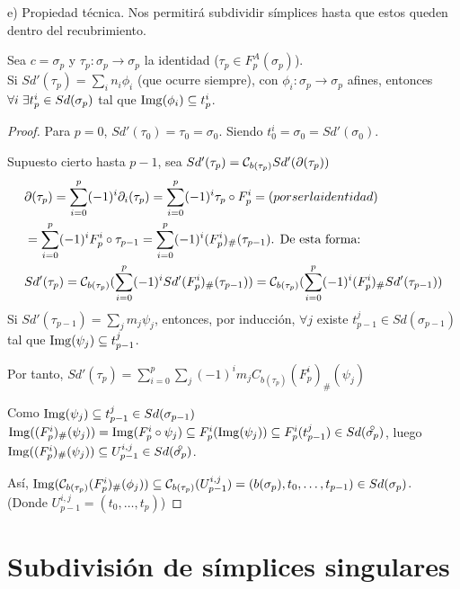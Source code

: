e) Propiedad técnica. Nos permitirá subdividir símplices hasta que estos queden dentro del recubrimiento.

Sea $c = \sigma_p$ y $\tau_p \colon \sigma_p \to \sigma_p$ la identidad ($\tau_p \in F_p^A(\sigma_p)$). \\
Si $Sd'(\tau_p) = \sum_i n_i \phi_i$ (que ocurre siempre), con $\phi_i \colon \sigma_p \to \sigma_p$ afines, entonces
$\forall i \hspace{0.3em} \exists t_p^i \in Sd(\sigma_p)$ tal que $\operatorname{Img}(\phi_i) \subseteq t_p^i$.

\begin{proof}
  Para $p = 0$, $Sd'(\tau_0) = \tau_0 = \sigma_0$. Siendo $t_0^i = \sigma_0 = Sd'(\sigma_0)$.

  Supuesto cierto hasta $p-1$, sea $Sd'(\tau_p) = {\mathcal C}_{b(\tau_p)} Sd'(\partial(\tau_p))$
  \begin{align*}
    &\partial(\tau_p) = \sum\limits_{i = 0}^p (-1)^i \partial_i(\tau_p) = \sum\limits_{i = 0}^p (-1)^i \tau_p \circ F_p^i = (por ser la identidad) \\
    &= \sum\limits_{i = 0}^p (-1)^i F_p^i \circ \tau_{p-1} = \sum\limits_{i = 0}^p (-1)^i(F_p^i)_\# (\tau_{p-1}) \text{. De esta forma:} \\
    &Sd'(\tau_p) = {\mathcal C}_{b(\tau_p)}(\sum\limits_{i = 0}^p (-1)^i Sd'(F_p^i)_\# (\tau_{p-1})) = {\mathcal C}_{b(\tau_p)}(\sum\limits_{i = 0}^p (-1)^i(F_p^i)_\# Sd'(\tau_{p-1})) \\
  \end{align*}
  Si $Sd'(\tau_{p-1}) = \sum\limits_j m_j \psi_j$, entonces, por inducción, $\forall j$ existe $t_{p-1}^j \in Sd(\sigma_{p-1})$ tal que
  $\operatorname{Img}(\psi_j) \subseteq t_{p-1}^j$.

  Por tanto, $Sd'(\tau_p) = \sum\limits_{i = 0}^p \sum\limits_j (-1)^i m_j C_{b(\tau_p)}(F_p^i)_\# (\psi_j)$

  Como $\operatorname{Img}(\psi_j) \subseteq t_{p-1}^j \in Sd(\sigma_{p-1})$
  $\Img((F_p^i)_\# (\psi_j)) = \Img(F_p^i \circ \psi_j) \subseteq F_p^i(\Img(\psi_j)) \subseteq F_p^i(t_{p-1}^j) \in Sd(\interior{\sigma_p})$,
  luego $\Img((F_p^i)_\# (\psi_j)) \subseteq U_{p-1}^{i,j} \in Sd(\interior{\sigma_p})$.

  Así, $\operatorname{Img}({\mathcal C}_{b(\tau_p)}(F_p^i)_\# (\phi_j)) \subseteq {\mathcal C}_{b(\tau_p)}(U_{p-1}^{i, j}) = (b(\sigma_p), t_0, \dots, t_{p-1}) \in Sd(\sigma_p)$.\\
  (Donde $U_{p-1}^{i,j} = (t_0, \dots, t_p)$)
\end{proof}

\section{Subdivisión de símplices singulares}

